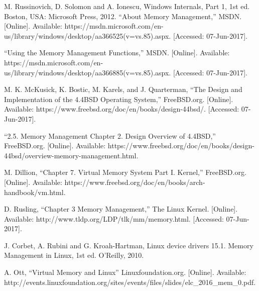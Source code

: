 \documentclass[letterpaper,10pt,titlepage,draftclsnofoot,onecolumn]{IEEEtran}
\begin{document}
\begin{thebibliography}{10}
M. Russinovich, D. Solomon and A. Ionescu, Windows Internals, Part 1, 1st ed. Boston, USA: Microsoft Press, 2012.
“About Memory Management,” MSDN. [Online]. Available: https://msdn.microsoft.com/en-us/library/windows/desktop/aa366525(v=vs.85).aspx. [Accessed: 07-Jun-2017].

“Using the Memory Management Functions,” MSDN. [Online]. Available: https://msdn.microsoft.com/en-us/library/windows/desktop/aa366885(v=vs.85).aspx. [Accessed: 07-Jun-2017].

M. K. McKusick, K. Bostic, M. Karels, and J. Quarterman, “The Design and Implementation of the 4.4BSD Operating System,” FreeBSD.org. [Online]. Available: https://www.freebsd.org/doc/en/books/design-44bsd/. [Accessed: 07-Jun-2017].

“2.5. Memory Management Chapter 2. Design Overview of 4.4BSD,” FreeBSD.org. [Online]. Available: https://www.freebsd.org/doc/en/books/design-44bsd/overview-memory-management.html.

M. Dillion, “Chapter 7. Virtual Memory System Part I. Kernel,” FreeBSD.org. [Online]. Available: https://www.freebsd.org/doc/en/books/arch-handbook/vm.html.

D. Rusling, “Chapter 3 Memory Management,” The Linux Kernel. [Online]. Available: http://www.tldp.org/LDP/tlk/mm/memory.html. [Accessed: 07-Jun-2017].

J. Corbet, A. Rubini and G. Kroah-Hartman, Linux device drivers 15.1. Memory Management in Linux, 1st ed. O'Reilly, 2010.

A. Ott, “Virtual Memory and Linux” Linuxfoundation.org. [Online]. Available: http://events.linuxfoundation.org/sites/events/files/slides/elc\_2016\_mem\_0.pdf.

\end{thebibliography}
\end{document}
